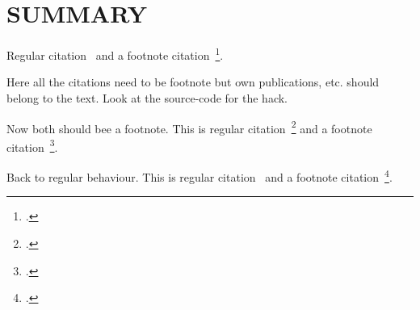 \documentclass[a4paper,11pt]{article}
\begin{document}


\newpage
\setcounter{tocdepth}{1}
\setcounter{section}{-1}
\tableofcontents



\newpage
\section{SUMMARY}
\label{sec:summary}

Regular citation~\cite{Xarticle} and a footnote citation~\footcite{Xbook}.

Here all the citations need to be footnote but own publications, etc. should belong to the text.
Look at the source-code for the hack.

\let\citeBk=\cite
\let\cite=\footcite

Now both should bee a footnote. This is regular citation~\cite{Xarticle_full} and a footnote citation~\footcite{Xbook_full}.

\let\cite=\citeBk

Back to regular behaviour. This is regular citation~\cite{Xarticle_full} and a footnote citation~\footcite{Xbook_full}.


% 


\end{document}

